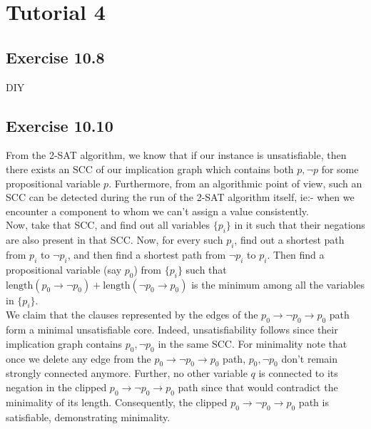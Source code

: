 \documentclass{article}
\begin{document}
\section{Tutorial 4}
\subsection*{Exercise 10.8}
DIY
\subsection*{Exercise 10.10}
From the 2-SAT algorithm, we know that if our instance is unsatisfiable, then there exists an SCC of our implication graph which contains both $p, \lnot p$ for some propositional variable $p$. Furthermore, from an algorithmic point of view, such an SCC can be detected during the run of the 2-SAT algorithm itself, ie:- when we encounter a component to whom we can't assign a value consistently.\\
Now, take that SCC, and find out all variables $\{p_i\}$ in it such that their negations are also present in that SCC. Now, for every such $p_i$, find out a shortest path from $p_i$ to $\lnot p_i$, and then find a shortest path from $\lnot p_i$ to $p_i$. Then find a propositional variable (say $p_0$) from $\{p_i\}$ such that $\mathrm{length}(p_0\rightarrow\lnot p_0) + \mathrm{length}(\lnot p_0\rightarrow p_0)$ is the minimum among all the variables in $\{p_i\}$.\\
We claim that the clauses represented by the edges of the $p_0\rightarrow\lnot p_0\rightarrow p_0$ path form a minimal unsatisfiable core. Indeed, unsatisfiability follows since their implication graph contains $p_0, \lnot p_0$ in the same SCC. For minimality note that once we delete any edge from the $p_0\rightarrow\lnot p_0\rightarrow p_0$ path, $p_0, \lnot p_0$ don't remain strongly connected anymore. Further, no other variable $q$ is connected to its negation in the clipped $p_0\rightarrow\lnot p_0\rightarrow p_0$ path since that would contradict the minimality of its length. Consequently, the clipped $p_0\rightarrow\lnot p_0\rightarrow p_0$ path is satisfiable, demonstrating minimality.
\end{document}
